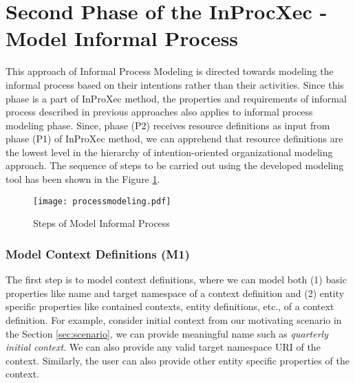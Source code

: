 \section{Second Phase of the InProcXec - Model Informal Process}
\label{sec:informalprocessmodeling}
This approach of Informal Process Modeling is directed towards modeling the informal process based on their intentions rather than their activities.  Since this phase is a part of InProXec method, the properties and requirements of informal process described in previous approaches \cite{Sungur2014a,Sungur2015} also applies to informal process modeling phase. Since, phase (P2) receives resource definitions as input from phase (P1) of InProXec method, we can apprehend that resource definitions are the lowest level in the hierarchy of intention-oriented organizational modeling approach. The sequence of steps to be carried out using the developed modeling tool has been shown in the Figure \ref{fig:processdiagram}. 

\begin{figure}
	\centering
	\texttt{[image: processmodeling.pdf]}
	\caption{Steps of Model Informal Process}
	\label{fig:processdiagram}
\end{figure}

\subsubsection{Model Context Definitions (M1)}  
The first step is to model context definitions, where we can model both (1) basic properties like name and target namespace of a context definition and (2) entity specific properties like contained contexts, entity definitions, etc., of a context definition. For example, consider initial context from our motivating scenario in the Section \ref{sec:scenario}, we can provide meaningful name such as \textit{quarterly initial context}. We can also provide any valid target namespace URI of the context. Similarly, the user can also provide other entity specific properties of the context. 

